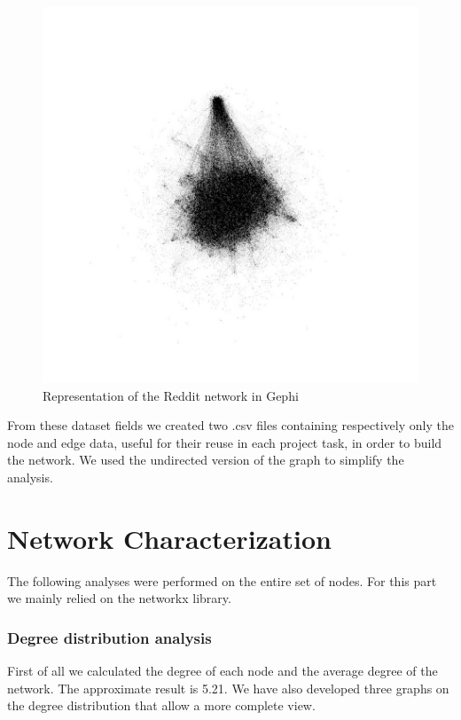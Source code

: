 \documentclass[sigchi]{acmart}
\begin{document}
\begin{figure}[hbpt]
  \centering
  \includegraphics[width=0.8\linewidth]{img/reddit_comments_network.jpg}
  \caption{Representation of the Reddit network in Gephi}
  \label{fig:Reddit network representation}
\end{figure}

\noindent From these dataset fields we created two .csv files containing respectively only the node and edge data, useful for their reuse in each project task, in order to build the network. We used the undirected version of the graph to simplify the analysis.

\section{Network Characterization} The following analyses were performed on the entire set of nodes. For this part we mainly relied on the networkx \cite{hagberg2008exploring} library.
\subsubsection{Degree distribution analysis} First of all we calculated the degree of each node and the average degree of the network. The approximate result is 5.21.
We have also developed three graphs on the degree distribution that allow a more complete view.
\end{document}
